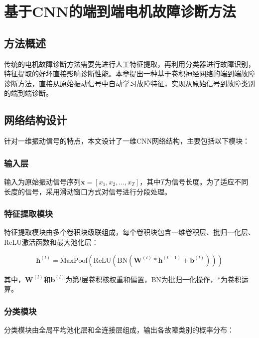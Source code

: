 \chapter{基于CNN的端到端电机故障诊断方法}

\section{方法概述}

传统的电机故障诊断方法需要先进行人工特征提取，再利用分类器进行故障识别，特征提取的好坏直接影响诊断性能。本章提出一种基于卷积神经网络的端到端故障诊断方法，直接从原始振动信号中自动学习故障特征，实现从原始信号到故障类别的端到端诊断。

\section{网络结构设计}

针对一维振动信号的特点，本文设计了一维CNN网络结构，主要包括以下模块：

\subsection{输入层}

输入为原始振动信号序列$\mathbf{x} = [x_1, x_2, \ldots, x_T]$，其中$T$为信号长度。为了适应不同长度的信号，采用滑动窗口方式对信号进行分段处理。

\subsection{特征提取模块}

特征提取模块由多个卷积块级联组成，每个卷积块包含一维卷积层、批归一化层、ReLU激活函数和最大池化层：

\begin{equation}
	\mathbf{h}^{(l)} = \text{MaxPool}\left(\text{ReLU}\left(\text{BN}\left(\mathbf{W}^{(l)} * \mathbf{h}^{(l-1)} + \mathbf{b}^{(l)}\right)\right)\right)
	\label{eq:convblock}
\end{equation}

其中，$\mathbf{W}^{(l)}$和$\mathbf{b}^{(l)}$为第$l$层卷积核权重和偏置，BN为批归一化操作，$*$为卷积运算。

\subsection{分类模块}

分类模块由全局平均池化层和全连接层组成，输出各故障类别的概率分布：

